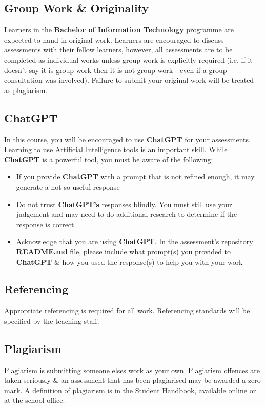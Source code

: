 \documentclass{article}
\begin{document}
\subsection*{Group Work \& Originality}
Learners in the \textbf{Bachelor of Information Technology} programme are expected to hand in original work. Learners are encouraged to discuss assessments with their fellow learners, however, all assessments are to be completed as individual works unless group work is explicitly required (i.e. if it doesn't say it is group work then it is not group work - even if a group consultation was involved). Failure to submit your original work will be treated as plagiarism.

\subsection*{ChatGPT}
In this course, you will be encouraged to use \textbf{ChatGPT} for your assessments. Learning to use Artificial Intelligence tools is an important skill. While \textbf{ChatGPT} is a powerful tool, you must be aware of the following:

\begin{itemize}
    \item If you provide \textbf{ChatGPT} with a prompt that is not refined enough, it may generate a not-so-useful response
    \item Do not trust \textbf{ChatGPT's} responses blindly. You must still use your judgement and may need to do additional research to determine if the response is correct
    \item Acknowledge that you are using \textbf{ChatGPT}. In the assessment's repository \textbf{README.md} file, please include what prompt(s) you provided to \textbf{ChatGPT} \& how you used the response(s) to help you with your work
\end{itemize}

\subsection*{Referencing}
Appropriate referencing is required for all work. Referencing standards will be specified by the teaching staff.

\subsection*{Plagiarism}
Plagiarism is submitting someone elses work as your own. Plagiarism offences are taken seriously \& an assessment that has been plagiarised may be awarded a zero mark. A definition of plagiarism is in the Student Handbook, available online or at the school office.
\end{document}

